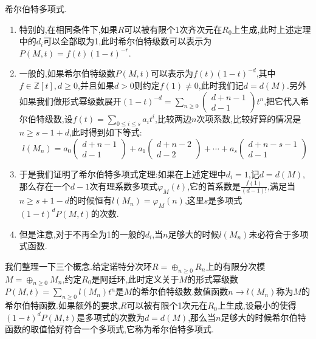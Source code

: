 希尔伯特多项式.
\begin{enumerate}
	\item 特别的,在相同条件下,如果$R$可以被有限个1次齐次元在$R_0$上生成,此时上述定理中的$d_i$可以全部取为1,此时希尔伯特级数可以表示为$P(M,t)=f(t)(1-t)^{-r}$.
	\item 一般的,如果希尔伯特级数$P(M,t)$可以表示为$f(t)(1-t)^{-d}$,其中$f\in\mathbb{Z}[t],d\ge0$,并且如果$d>0$则约定$f(1)\not=0$,此时我们记$d=d(M)$.另外如果我们做形式幂级数展开$(1-t)^{-d}=\sum_{n\ge0}\left(\begin{array}{c}d+n-1\\d-1\end{array}\right)t^n$,把它代入希尔伯特级数,设$f(t)=\sum_{0\le i\le s}a_it^i$,比较两边$n$次项系数,比较好算的情况是$n\ge s-1+d$,此时得到如下等式:
	$$l(M_n)=a_0\left(\begin{array}{c}d+n-1\\d-1\end{array}\right)+a_1\left(\begin{array}{c}d+n-2\\d-2\end{array}\right)+\cdots+a_s\left(\begin{array}{c}d+n-s-1\\d-1\end{array}\right)$$
	\item 于是我们证明了希尔伯特多项式定理:如果在上述定理中$d_i=1$,记$d=d(M)$,那么存在一个$d-1$次有理系数多项式$\varphi_M(t)$,它的首系数是$\frac{f(1)}{(d-1)!}$,满足当$n\ge s+1-d$的时候恒有$l(M_n)=\varphi_M(n)$,这里$s$是多项式$(1-t)^dP(M,t)$的次数.
	\item 但是注意,对于不再全为1的一般的$d_i$,当$n$足够大的时候$l(M_n)$未必符合于多项式函数.
\end{enumerate}

我们整理一下三个概念.给定诺特分次环$R=\oplus_{n\ge0}R_n$上的有限分次模$M=\oplus_{n\ge0}M_n$,约定$R_0$是阿廷环,此时定义关于$M$的形式幂级数$P(M,t)=\sum_{n\ge0}l(M_n)t^n$是$M$的希尔伯特级数.数值函数$n\to l(M_n)$称为$M$的希尔伯特函数.如果额外的要求,$R$可以被有限个1次元在$R_0$上生成,设最小的使得$(1-t)^dP(M,t)$是多项式的次数为$d=d(M)$,那么当$n$足够大的时候希尔伯特函数的取值恰好符合一个多项式,它称为希尔伯特多项式.

